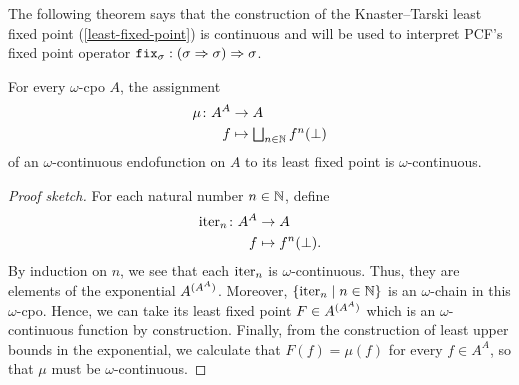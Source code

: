 The following theorem says that the construction of the Knaster--Tarski least
fixed point (\cref{least-fixed-point}) is continuous and will be used to
interpret PCF's fixed point operator
\(\pcffix_\sigma : \pa*{\sigma \pcffun \sigma} \pcffun \sigma\).
\begin{theorem}\label{least-fixed-point-is-continuous}
  For every \(\omega\)-cpo \(A\), the assignment
  \begin{align*}
    \mu \colon A^A &\to A \\
    f &\mapsto \textstyle\bigsqcup_{n \in \Nat}f^n(\bot)
  \end{align*}
  of an \(\omega\)-continuous endofunction on \(A\) to its least fixed point is
  \(\omega\)-continuous.
\end{theorem}
\begin{proof}[Proof sketch]
  For each natural number \(n \in \Nat\), define
  \begin{align*}
    \iter_n \colon A^A &\to A \\
    f &\mapsto f^n(\bot).
  \end{align*}
  By induction on \(n\), we see that each \(\iter_n\) is \(\omega\)-continuous.
  Thus, they are elements of the exponential \(A^{\pa{A^A}}\).
  Moreover, \(\set{\iter_n \mid n \in \Nat}\) is an \(\omega\)-chain in this
  \(\omega\)-cpo.
  Hence, we can take its least fixed point \(F \in A^{\pa{A^A}}\) which is an
  \(\omega\)-continuous function by construction.
  Finally, from the construction of least upper bounds in the exponential, we
  calculate that \(F(f) = \mu(f)\) for every \(f \in A^A\), so that \(\mu\)
  must be \(\omega\)-continuous.
\end{proof}

